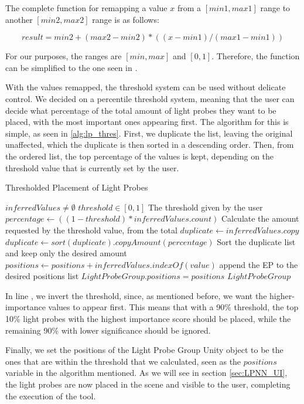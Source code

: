 The complete function for remapping a value $x$ from a \([min1, max1]\) range to another \([min2, max2]\) range is as follows:

\[ result = min2 + (max2 - min2) * ((x - min1)/(max1 - min1)) \]

For our purposes, the ranges are \([min, max]\) and \([0, 1]\). Therefore, the function can be simplified to the one seen in .

With the values remapped, the threshold system can be used without delicate control. We decided on a percentile threshold system, meaning that the user can decide what percentage of the total amount of light probes they want to be placed, with the most important ones appearing first. The algorithm for this is simple, as seen in \ref{alg:lp_thres}. First, we duplicate the list, leaving the original unaffected, which the duplicate is then sorted in a descending order. Then, from the ordered list, the top percentage of the values is kept, depending on the threshold value that is currently set by the user.

\begin{algorithm}
	\caption{Thresholded Placement of Light Probes}
	\label{alg:lp_thres}
	\begin{algorithmic}[1]
		\Require $inferredValues \neq \emptyset$
		\Require $threshold \in [0, 1]$
		\Comment The threshold given by the user
		\State $percentage \gets ((1-threshold) * inferredValues.count)$
		\Comment Calculate the amount requested by the threshold value, from the total
		\label{alg:lp_thres:1}
		\State $duplicate \gets inferredValues.copy$
		\State $duplicate \gets sort(duplicate).copyAmount(percentage)$
		\Comment Sort the duplicate list and keep only the desired amount
			\State $positions \gets positions + inferredValues.indexOf(value)$
			\Comment append the EP to the desired positions list
		\EndFor
		\State $LightProbeGroup.positions = positions$
		\State \Return $Light Probe Group$
	\end{algorithmic}
\end{algorithm}

In line , we invert the threshold, since, as mentioned before, we want the higher-importance values to appear first. This means that with a 90\% threshold, the top 10\% light probes with the highest importance score should be placed, while the remaining 90\% with lower significance should be ignored. 

Finally, we set the positions of the Light Probe Group Unity object to be the ones that are within the threshold that we calculated, seen as the $positions$ variable in the algorithm mentioned. As we will see in section \ref{sec:LPNN_UI}, the light probes are now placed in the scene and visible to the user, completing the execution of the tool.

